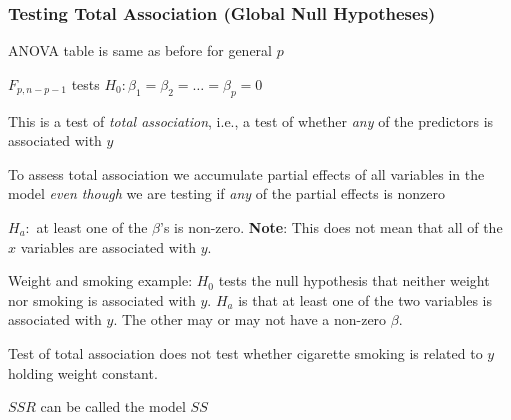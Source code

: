 \subsubsection{Testing Total Association (Global Null Hypotheses)}
\bi
\item ANOVA table is same as before for general $p$
\item $F_{p, n-p-1}$ tests $H_{0}:
  \beta_{1}=\beta_{2}=\ldots=\beta_{p}=0$
\item This is a test of \emph{total association}, i.e., a test of
  whether \emph{any} of the predictors is associated with $y$
\item To assess total association we accumulate partial effects of all
  variables in the model \emph{even though} we are testing if
  \emph{any} of the partial effects is nonzero
\item $H_{a}:$ at least one of the $\beta$'s is non-zero.
  \textbf{Note}: This does not mean that all of the $x$ variables are
  associated with $y$.
\item Weight and smoking example: $H_{0}$ tests the null hypothesis
  that neither weight nor smoking is associated with $y$.  $H_{a}$ is
  that at least one of the two variables is associated with $y$.  The
  other may or may not have a non-zero $\beta$.
\item Test of total association does not test whether cigarette
  smoking is related to $y$ holding weight constant.
\item $SSR$ can be called the model $SS$
\ei

